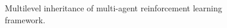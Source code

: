 \documentclass{ituphdreport}
\begin{document}
\begin{figure}[h]
	\begin{center}
	\end{center}
	\caption{Multilevel inheritance of multi-agent reinforcement learning framework.
		\label{fig:inheritgraphcombined_1}}
\end{figure}
\end{document}
